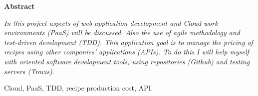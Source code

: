 \documentclass[spanish,a4paper,twoside]{report}
\newenvironment{summary}
{\par\noindent\begin{center}\textbf{Abstract}\end{center}\begin{itshape}\par\noindent}
{\end{itshape}}
\newenvironment{keywords}
{\begin{list}{}{\setlength{\leftmargin}{1em}}\item[\hskip\labelsep \bfseries Keywords:]}
{\end{list}}
\begin{document}
\newpage
\begin{summary}
{\em 
In this project aspects of web application development and Cloud work environments (PaaS) will be discussed. Also the use of agile methodology and test-driven development (TDD). This application goal is to manage the pricing of recipes using other companies' applications (APIs). To do this I will help myself with oriented software development tools, using repositories (Github) and testing servers (Travis).
}

\vspace*{0.2in}
\begin{keywords}
  Cloud, PaaS, TDD, recipe production cost, API.
\end{keywords}

\end{summary}

\newpage{\pagestyle{empty}\cleardoublepage}
\thispagestyle{empty}



\pagestyle{myheadings} %

\renewcommand{\thepage}{\arabic{page}}
\setcounter{page}{1}


\tableofcontents

\newpage{\pagestyle{empty}\cleardoublepage}

\listoffigures

\newpage{\pagestyle{empty}\cleardoublepage}

\lstlistoflistings

\newpage{\pagestyle{empty}\cleardoublepage}
\end{document}
